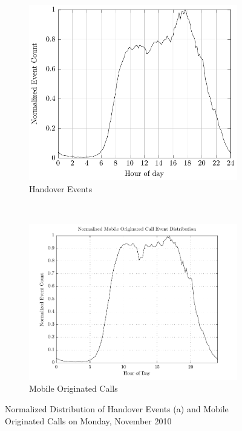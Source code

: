 \documentclass[master,english]{hgbthesis}
\begin{document}
\begin{figure}
	\centering
	\begin{subfigure}[b]{0.5\textwidth}
		\includegraphics[width=\textwidth]{./images/hauf_event_32_time_mat}
		\caption{Handover Events}
		\label{fig:disthandover}
	\end{subfigure}%
	~ %
	\begin{subfigure}[b]{0.5\textwidth}
		\includegraphics[width=\textwidth]{./images/hauf_event_34_time_mat}
		\caption{Mobile Originated Calls}
		\label{fig:distmoc}
	\end{subfigure}
	\caption{Normalized Distribution of Handover Events (a) and Mobile Originated Calls on Monday,  November 2010}\label{fig:distevents}
\end{figure}
\end{document}
